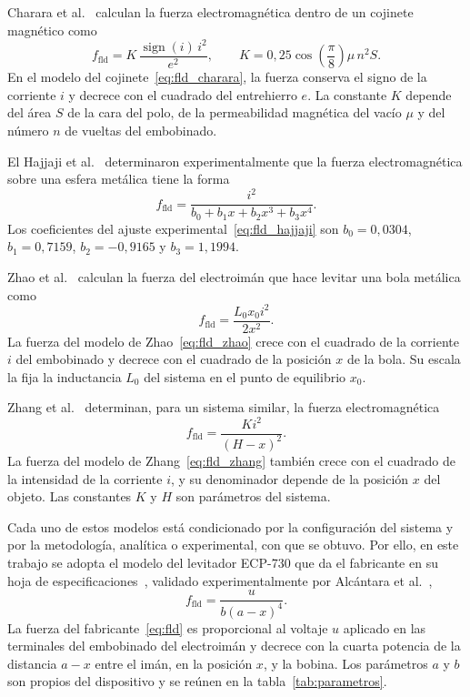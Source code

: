Charara et al.~\cite{charara} calculan la fuerza electromagnética dentro de un cojinete magnético como
\begin{equation}
f_{\text{fld}} = K\,\frac{\operatorname{sign}(i)\,i^{2}}{e^{2}},
\qquad
K = 0{,}25 \cos\!\left(\frac{\pi}{8}\right)\!\mu\, n^{2} S .
\label{eq:fld_charara}
\end{equation}
En el modelo del cojinete~\eqref{eq:fld_charara}, la fuerza conserva el signo de la corriente $i$ y decrece con el cuadrado del entrehierro $e$. La constante $K$ depende del área $S$ de la cara del polo, de la permeabilidad magnética del vacío $\mu$ y del número $n$ de vueltas del embobinado.

El Hajjaji et al.~\cite{el} determinaron experimentalmente que la fuerza electromagnética sobre una esfera metálica tiene la forma
\begin{equation}
f_{\text{fld}} = \dfrac{i^{2}}{b_0 + b_1x + b_2x^3 + b_3x^4} .
\label{eq:fld_hajjaji}
\end{equation}
Los coeficientes del ajuste experimental~\eqref{eq:fld_hajjaji} son $b_0=0{,}0304$, $b_1=0{,}7159$, $b_2=-0{,}9165$ y $b_3=1{,}1994$.

Zhao et al.~\cite{zhao} calculan la fuerza del electroimán que hace levitar una bola metálica como
\begin{equation}
f_{\text{fld}} = \frac{L_0 x_0 i^2}{2x^2} .
\label{eq:fld_zhao}
\end{equation}
La fuerza del modelo de Zhao~\eqref{eq:fld_zhao} crece con el cuadrado de la corriente $i$ del embobinado y decrece con el cuadrado de la posición $x$ de la bola. Su escala la fija la inductancia $L_0$ del sistema en el punto de equilibrio $x_0$.

Zhang et al.~\cite{feifei} determinan, para un sistema similar, la fuerza electromagnética
\begin{equation}
f_{\text{fld}} = \frac{K i^2}{(H - x)^2} .
\label{eq:fld_zhang}
\end{equation}
La fuerza del modelo de Zhang~\eqref{eq:fld_zhang} también crece con el cuadrado de la intensidad de la corriente $i$, y su denominador depende de la posición $x$ del objeto. Las constantes $K$ y $H$ son parámetros del sistema.

Cada uno de estos modelos está condicionado por la configuración del sistema y por la metodología, analítica o experimental, con que se obtuvo. Por ello, en este trabajo se adopta el modelo del levitador ECP-730 que da el fabricante en su hoja de especificaciones~\cite{parks}, validado experimentalmente por Alcántara et al.~\cite{alcantara},
\begin{equation}
f_{\text{fld}} = \frac{u}{b(a-x)^4} .
\label{eq:fld}
\end{equation}
La fuerza del fabricante~\eqref{eq:fld} es proporcional al voltaje $u$ aplicado en las terminales del embobinado del electroimán y decrece con la cuarta potencia de la distancia $a-x$ entre el imán, en la posición $x$, y la bobina. Los parámetros $a$ y $b$ son propios del dispositivo y se reúnen en la tabla~\ref{tab:parametros}.

